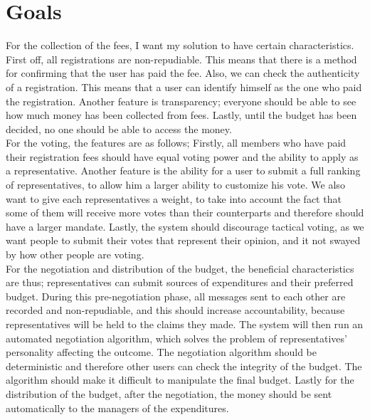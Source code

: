 \section{Goals}
For the collection of the fees, I want my solution to have certain characteristics. First off, all registrations are non-repudiable. This means that there is a method for confirming that the user has paid the fee. Also, we can check the authenticity of a registration. This means that a user can identify himself as the one who paid the registration. Another feature is transparency; everyone should be able to see how much money has been collected from fees. Lastly, until the budget has been decided, no one should be able to access the money. \\
For the voting, the features are as follows; Firstly, all members who have paid their registration fees should have equal voting power and the ability to apply as a representative. Another feature is the ability for a user to submit a full ranking of representatives, to allow him a larger ability to customize his vote. We also want to give each representatives a weight, to take into account the fact that some of them will receive more votes than their counterparts and therefore should have a larger mandate. Lastly, the system should discourage tactical voting, as we want people to submit their votes that represent their opinion, and it not swayed by how other people are voting. \\
For the negotiation and distribution of the budget, the beneficial characteristics are thus; representatives can submit sources of expenditures and their preferred budget. During this pre-negotiation phase, all messages sent to each other are recorded and non-repudiable, and this should increase accountability, because representatives will be held to the claims they made. The system will then run an automated negotiation algorithm, which solves the problem of representatives’ personality affecting the outcome. The negotiation algorithm should be deterministic and therefore other users can check the integrity of the budget. The algorithm should make it difficult to manipulate the final budget. Lastly for the distribution of the budget, after the negotiation, the money should be sent automatically to the managers of the expenditures.  







